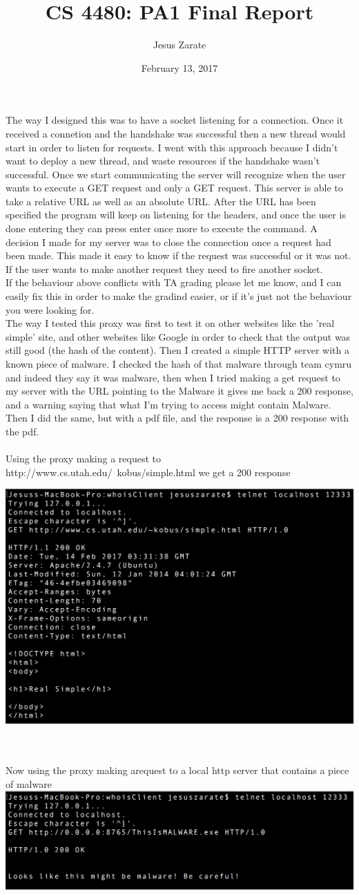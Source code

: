 \documentclass[12pt]{article}
\title{CS 4480: PA1 Final Report}
\author{Jesus Zarate}
\date{February 13, 2017}
\begin{document}
\maketitle

The way I designed this was to have a socket listening for a connection. Once it received a connetion and the handshake
was successful then a new thread would start in order to listen for requests. I went with this approach because I didn't
want to deploy a new thread, and waste resources if the handshake wasn't successful. Once we start communicating the server
 will recognize when the user wants to execute a GET request and only a GET request. This server is able to take a relative
 URL as well as an absolute URL. After the URL has been specified the program will keep on listening for the headers, and
 once the user is done entering they can press enter once more to execute the command. A decision I made for my server was
 to close the connection once a request had been made. This made it easy to know if the request was successful or it was not.
 If the user wants to make another request they need to fire another socket.\\

 If the behaviour above conflicts with TA grading please let me know, and I can easily fix this in order to make the
 gradind easier, or if it's just not the behaviour you were looking for.\\

The way I tested this proxy was first to test it on other websites like the 'real simple' site, and other websites
like Google in order to check that the output was still good (the hash of the content). Then I created a simple
HTTP server with a known piece of malware. I checked the hash of that malware through team cymru and indeed they say it
was malware, then when I tried making a get request to my server with the URL pointing to the Malware it gives me back
a 200 response, and a warning saying that what I'm trying to access might contain Malware. Then I did the same, but with
a pdf file, and the response is a 200 response with the pdf.\\\\



Using the proxy making a request to http://www.cs.utah.edu/~kobus/simple.html we get a 200 response

\includegraphics[width=.6\linewidth]{img/real_simple.png}


\\\\Now using the proxy making arequest to a local http server that contains a piece of malware \\


\includegraphics[width=.6\linewidth]{img/malware.png}
\end{document}
